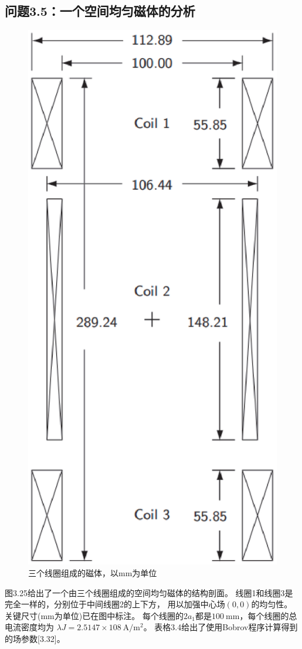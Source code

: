 \subsection{问题3.5：一个空间均匀磁体的分析}
\begin{figure}[htbp]
	\centering
	\includegraphics[scale=0.5]{chpt3/figs/fig3.25.eps}
	\caption{三个线圈组成的磁体，以mm为单位}
\end{figure}
图3.25给出了一个由三个线圈组成的空间均匀磁体的结构剖面。
线圈1和线圈3是完全一样的，分别位于中间线圈2的上下方，
用以加强中心场$(0,0)$的均匀性。
关键尺寸(mm为单位)已在图中标注。
每个线圈的$2a_1$都是$100\ \mathrm{mm}$，每个线圈的总电流密度均为
$\lambda J =2.5147×108\ \mathrm{A/m^2} $。
表格3.4给出了使用Bobrov程序计算得到的场参数[3.32]。


